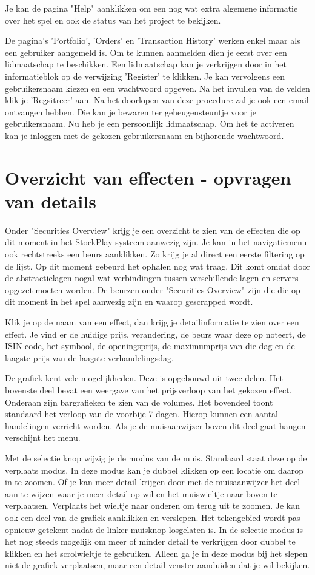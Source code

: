Je kan de pagina "Help" aanklikken om een nog wat extra algemene informatie over het spel en ook de status van het project te bekijken.

De pagina's 'Portfolio', 'Orders' en 'Transaction History' werken enkel maar als een gebruiker aangemeld is.
Om te kunnen aanmelden dien je eerst over een lidmaatschap te beschikken. Een lidmaatschap kan je verkrijgen door in het informatieblok op de verwijzing 'Register' te klikken. Je kan vervolgens een gebruikersnaam kiezen en een wachtwoord opgeven. Na het invullen van de velden klik je 'Regsitreer' aan.
Na het doorlopen van deze procedure zal je ook een email ontvangen hebben. Die kan je bewaren ter geheugensteuntje voor je gebruikersnaam.
Nu heb je een persoonlijk lidmaatschap. Om het te activeren kan je inloggen met de gekozen gebruikersnaam en bijhorende wachtwoord.

\section{Overzicht van effecten - opvragen van details}

Onder "Securities Overview" krijg je een overzicht te zien van de effecten die op dit moment in het StockPlay systeem aanwezig zijn. Je kan in het navigatiemenu ook rechtstreeks een beurs aanklikken. Zo krijg je al direct een eerste filtering op de lijst.
Op dit moment gebeurd het ophalen nog wat traag. Dit komt omdat door de abstractielagen nogal wat verbindingen tussen verschillende lagen en servers opgezet moeten worden.
De beurzen onder "Securities Overview" zijn die die op dit moment in het spel aanwezig zijn en waarop gescrapped wordt.

Klik je op de naam van een effect, dan krijg je detailinformatie te zien over een effect.
Je vind er de huidige prijs, verandering, de beurs waar deze op noteert, de ISIN code, het symbool, de openingsprijs, de maximumprijs van die dag en de laagste prijs van de laagste verhandelingsdag.

De grafiek kent vele mogelijkheden.
Deze is opgebouwd uit twee delen. Het bovenste deel bevat een weergave van het prijsverloop van het gekozen effect. Onderaan zijn bargrafieken te zien van de volumes. Het bovendeel toont standaard het verloop van de voorbije 7 dagen. Hierop kunnen een aantal handelingen verricht worden.
Als je de muisaanwijzer boven dit deel gaat hangen verschijnt het menu.

Met de selectie knop wijzig je de modus van de muis. Standaard staat deze op de verplaats modus.
In deze modus kan je dubbel klikken op een locatie om daarop in te zoomen. Of je kan meer detail krijgen door met de muisaanwijzer het deel aan te wijzen waar je meer detail op wil en het muiswieltje naar boven te verplaatsen. Verplaats het wieltje naar onderen om terug uit te zoomen.
Je kan ook een deel van de grafiek aanklikken en verslepen. Het tekengebied wordt pas opnieuw getekent nadat de linker muisknop losgelaten is.
In de selectie modus is het nog steeds mogelijk om meer of minder detail te verkrijgen door dubbel te klikken en het scrolwieltje te gebruiken.
Alleen ga je in deze modus bij het slepen niet de grafiek verplaatsen, maar een detail venster aanduiden dat je wil bekijken.

